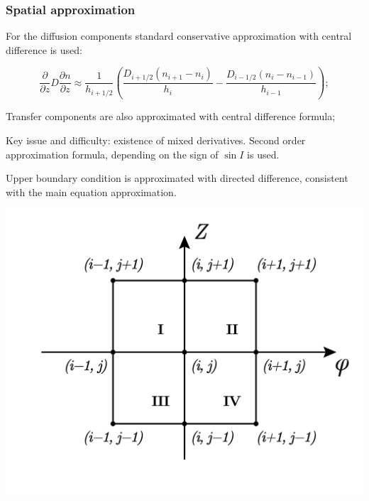 \documentclass[9pt, apectratio=43,unicode]{beamer}
\begin{document}
\begin{frame}\frametitle{Spatial approximation}
\begin{itemize}
\item[•] For the diffusion components standard conservative approximation with central difference is used:

$$\dfrac{\partial}{\partial z}D\dfrac{\partial n}{\partial z} \approx \dfrac{1}{h_{i+1/2}}\left(\dfrac{D_{i+1/2}(n_{i+1}-n_i)}{h_i}-\dfrac{D_{i-1/2}(n_{i}-n_{i-1})}{h_{i-1}}\right);$$

\item[•] Transfer components are also approximated with central difference formula;


\parbox[b][5cm][t]{50mm}{
\item[•] Key issue and difficulty: existence of mixed derivatives. Second order approximation formula, depending on the sign of $\sin I$ is used.

\item[•] Upper boundary condition is approximated with directed difference, consistent with the main equation approximation.
}
\hfill
\parbox[b][5cm][t]{60mm}{
\includegraphics[scale = 0.3]{square}
}

\end{itemize}

\end{frame}
\end{document}
